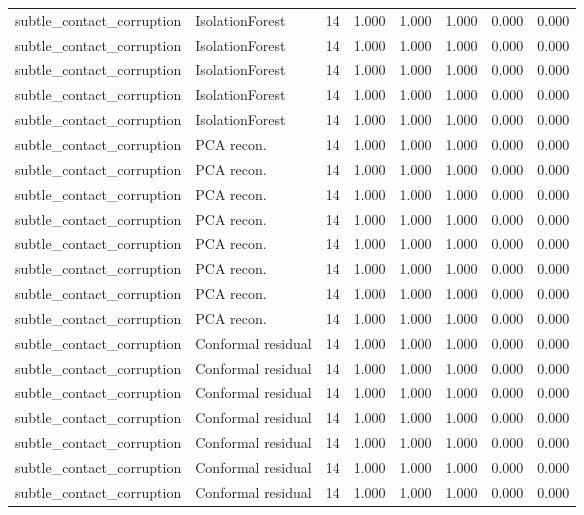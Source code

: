 {\begin{longtable}{llrrrrrr}
subtle\_contact\_corruption & IsolationForest & 14 & 1.000 & 1.000 & 1.000 & 0.000 & 0.000 \\
subtle\_contact\_corruption & IsolationForest & 14 & 1.000 & 1.000 & 1.000 & 0.000 & 0.000 \\
subtle\_contact\_corruption & IsolationForest & 14 & 1.000 & 1.000 & 1.000 & 0.000 & 0.000 \\
subtle\_contact\_corruption & IsolationForest & 14 & 1.000 & 1.000 & 1.000 & 0.000 & 0.000 \\
subtle\_contact\_corruption & IsolationForest & 14 & 1.000 & 1.000 & 1.000 & 0.000 & 0.000 \\
subtle\_contact\_corruption & PCA recon. & 14 & 1.000 & 1.000 & 1.000 & 0.000 & 0.000 \\
subtle\_contact\_corruption & PCA recon. & 14 & 1.000 & 1.000 & 1.000 & 0.000 & 0.000 \\
subtle\_contact\_corruption & PCA recon. & 14 & 1.000 & 1.000 & 1.000 & 0.000 & 0.000 \\
subtle\_contact\_corruption & PCA recon. & 14 & 1.000 & 1.000 & 1.000 & 0.000 & 0.000 \\
subtle\_contact\_corruption & PCA recon. & 14 & 1.000 & 1.000 & 1.000 & 0.000 & 0.000 \\
subtle\_contact\_corruption & PCA recon. & 14 & 1.000 & 1.000 & 1.000 & 0.000 & 0.000 \\
subtle\_contact\_corruption & PCA recon. & 14 & 1.000 & 1.000 & 1.000 & 0.000 & 0.000 \\
subtle\_contact\_corruption & PCA recon. & 14 & 1.000 & 1.000 & 1.000 & 0.000 & 0.000 \\
subtle\_contact\_corruption & Conformal residual & 14 & 1.000 & 1.000 & 1.000 & 0.000 & 0.000 \\
subtle\_contact\_corruption & Conformal residual & 14 & 1.000 & 1.000 & 1.000 & 0.000 & 0.000 \\
subtle\_contact\_corruption & Conformal residual & 14 & 1.000 & 1.000 & 1.000 & 0.000 & 0.000 \\
subtle\_contact\_corruption & Conformal residual & 14 & 1.000 & 1.000 & 1.000 & 0.000 & 0.000 \\
subtle\_contact\_corruption & Conformal residual & 14 & 1.000 & 1.000 & 1.000 & 0.000 & 0.000 \\
subtle\_contact\_corruption & Conformal residual & 14 & 1.000 & 1.000 & 1.000 & 0.000 & 0.000 \\
subtle\_contact\_corruption & Conformal residual & 14 & 1.000 & 1.000 & 1.000 & 0.000 & 0.000 \\

\end{longtable}}
